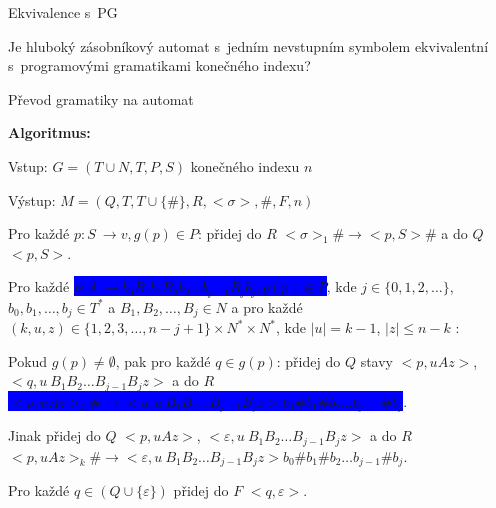 \documentclass[a4paper,fyma3]{prosper}
\theoremstyle{definition}
\begin{document}
\begin{slide}{Ekvivalence s~PG}
\bigskip
\bigskip


Je hluboký zásobníkový automat s~jedním nevstupním symbolem ekvivalentní s~programovými gramatikami konečného indexu?
\medskip

\end{slide}

\begin{slide}{Převod gramatiky na automat}
\begin{list}{}{\setlength\parsep{0cm} \setlength\itemsep{0cm} \setlength\leftmargin{1em}}
\item \textbf{Algoritmus:} \medskip
  \item Vstup: $G = (T \cup N ,T,P,S)$ konečného indexu $n$
  \item Výstup: $M = (Q, T, T \cup \{\#\}, R, <\sigma>, \# , F, n)$ \medskip

  \item Pro každé $p: S~\rightarrow v, g(p) \in P$:
  \subitem přidej do $R$ $<\sigma>_1 \# \rightarrow <p, S> \#$ a do $Q$ $<p, S>$.\medskip

  \item Pro každé \colorbox{blue}{\black $p: A~\rightarrow b_0 B_1 b_1 B_2 b_2 \dots b_{j-1} B_{j} b_j, g(p) \in P$}, kde $j \in \{0,1,2,\dots\}$, $b_0,b_1,\dots,b_j \in T^*$ a $B_1,B_2,\dots,B_j \in N$ a pro každé $(k,u,z) \in \{1,2,3,\dots,n-j+1\} \times N^* \times N^*$, kde $|u| = k-1$, $|z|  \le n-k$ : \medskip

  \subitem Pokud $g(p) \ne \emptyset$, pak pro každé $q \in g(p)$:
  \subitem přidej do $Q$ stavy $<p,uAz>$, $<q, u~B_1 B_2 \dots B_{j-1} B_{j} z>$ a do $R$
  \subitem  \colorbox{blue}{\black$<p,uAz>_k \# \rightarrow <q, u~B_1 B_2 \dots B_{j-1} B_{j} z> b_0 \# b_1 \# b_2 \dots b_{j-1} \# b_j$}.  \medskip

  \subitem Jinak přidej do $Q$ $<p,uAz>$, $<\varepsilon, u~B_1 B_2 \dots B_{j-1} B_{j} z>$ a do $R$ 
\subitem $<p,uAz>_k \# \rightarrow <\varepsilon, u~B_1 B_2 \dots B_{j-1} B_{j} z> b_0 \# b_1 \# b_2 \dots b_{j-1} \# b_j$.\medskip


  \item Pro každé $q \in (Q \cup \{\varepsilon\})$ přidej do $F$ $<q, \varepsilon>$.

\end{list}

\end{slide}
\end{document}
